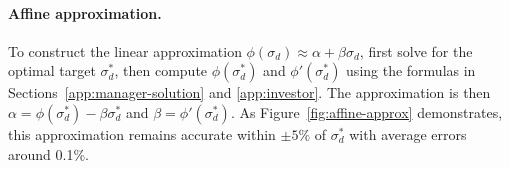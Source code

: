 \paragraph{Affine approximation.}
To construct the linear approximation $\phi(\sigma_d) \approx \alpha + \beta\sigma_d$, first solve for the optimal target $\sigma_d^*$, then compute $\phi(\sigma_d^*)$ and $\phi'(\sigma_d^*)$ using the formulas in Sections~\ref{app:manager-solution} and \ref{app:investor}. The approximation is then $\alpha = \phi(\sigma_d^*) - \beta\sigma_d^*$ and $\beta = \phi'(\sigma_d^*)$. As Figure~\ref{fig:affine-approx} demonstrates, this approximation remains accurate within $\pm 5\%$ of $\sigma_d^*$ with average errors around 0.1\%.
